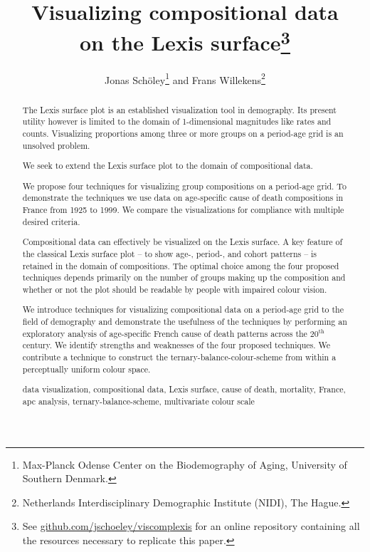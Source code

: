 \documentclass[parskip=half]{scrartcl}
\title{Visualizing compositional data \\ on the Lexis surface\footnote{See \url{github.com/jschoeley/viscomplexis} for an online repository containing all the resources necessary to replicate this paper.}}
\author{Jonas Schöley\footnote{Max-Planck Odense Center on the Biodemography of Aging, University of Southern Denmark.} and Frans Willekens\footnote{Netherlands Interdisciplinary Demographic Institute (NIDI), The Hague.}}
\begin{document}
\maketitle

\begin{abstract}

The Lexis surface plot is an established visualization tool in demography. Its present utility however is limited to the domain of 1-dimensional magnitudes like rates and counts. Visualizing proportions among three or more groups on a period-age grid is an unsolved problem.

We seek to extend the Lexis surface plot to the domain of compositional data.

We propose four techniques for visualizing group compositions on a period-age grid. To demonstrate the techniques we use data on age-specific cause of death compositions in France from 1925 to 1999. We compare the visualizations for compliance with multiple desired criteria.

Compositional data can effectively be visualized on the Lexis surface. A key feature of the classical Lexis surface plot -- to show age-, period-, and cohort patterns -- is retained in the domain of compositions. The optimal choice among the four proposed techniques depends primarily on the number of groups making up the composition and whether or not the plot should be readable by people with impaired colour vision.

We introduce techniques for visualizing compositional data on a period-age grid to the field of demography and demonstrate the usefulness of the techniques by performing an exploratory analysis of age-specific French cause of death patterns across the 20$^\text{th}$ century. We identify strengths and weaknesses of the four proposed techniques. We contribute a technique to construct the ternary-balance-colour-scheme from within a perceptually uniform colour space.

\bigskip{}
data visualization, compositional data, Lexis surface, cause of death, mortality, France, apc analysis, ternary-balance-scheme, multivariate colour scale

\end{abstract}

\clearpage

\end{document}
